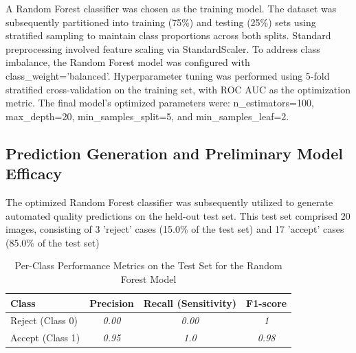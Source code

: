 A Random Forest classifier was chosen as the training model. The dataset was subsequently partitioned into training (75\%) and testing (25\%) sets using stratified sampling to maintain class proportions across both splits. Standard preprocessing involved feature scaling via StandardScaler. To address class imbalance, the Random Forest model was configured with class\_weight='balanced'. Hyperparameter tuning was performed using 5-fold stratified cross-validation on the training set, with ROC AUC as the optimization metric. The final model's optimized parameters were: n\_estimators=100, max\_depth=20, min\_samples\_split=5, and min\_samples\_leaf=2.

\subsection{Prediction Generation and Preliminary Model Efficacy}
\label{ssec:model_efficacy_revised} 

The optimized Random Forest classifier was subsequently utilized to generate automated quality predictions on the held-out test set. This test set comprised 20 images, consisting of 3 'reject' cases (15.0\% of the test set) and 17 'accept' cases (85.0\% of the test set)

\begin{table}[htbp]
\centering
\caption{Per-Class Performance Metrics on the Test Set for the Random Forest Model}
\label{tab:per_class_metrics_revised}
\begin{tabular}{lccc}
\toprule
\textbf{Class} & \textbf{Precision} & \textbf{Recall (Sensitivity)} & \textbf{F1-score} \\
\midrule
Reject (Class 0) & \textit{0.00} & \textit{0.00} & \textit{1} \\
Accept (Class 1) & \textit{0.95} & \textit{1.0} & \textit{0.98} \\
\bottomrule
\end{tabular}
\end{table}

